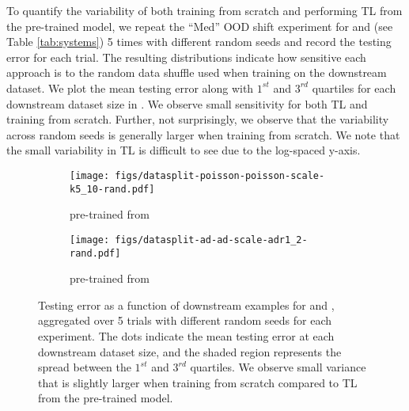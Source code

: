 To quantify the variability of both training from scratch and performing TL from the pre-trained model, we repeat the ``Med'' OOD shift experiment for \sysA{} and \sysB{} (see Table \ref{tab:systems}) 5 times with different random seeds and record the testing error for each trial. The resulting distributions indicate how sensitive each approach is to the random data shuffle used when training on the downstream dataset. We plot the mean testing error along with $1^{st}$ and $3^{rd}$ quartiles for each downstream dataset size in . We observe small sensitivity for both TL and training from scratch. Further, not surprisingly, we observe that the variability across random seeds is generally larger when training from scratch. We note that the small variability in TL is difficult to see due to the log-spaced y-axis.

\begin{figure*}[!htbp]
  \begin{subfigure}{.5\textwidth}
  \centering
  \texttt{[image: figs/datasplit-poisson-poisson-scale-k5\_10-rand.pdf]}  
  \caption{\sysAfiveten{} pre-trained from \sysAonefive{}}
\end{subfigure}%
\begin{subfigure}{.5\textwidth}
  \centering
  \texttt{[image: figs/datasplit-ad-ad-scale-adr1\_2-rand.pdf]}  
  \caption{\sysBonetwo{} pre-trained from \sysBzeropttwoone{}}
\end{subfigure}
\caption{Testing error as a function of downstream examples  for \sysA{} and \sysB{}, aggregated over 5 trials with different random seeds for each experiment. The dots indicate the mean testing error at each downstream dataset size, and the shaded region represents the spread between the $1^{st}$ and $3^{rd}$ quartiles. We observe small variance that is slightly larger when training from scratch compared to TL from the pre-trained model.}
\label{fig:seeds}
\end{figure*}

